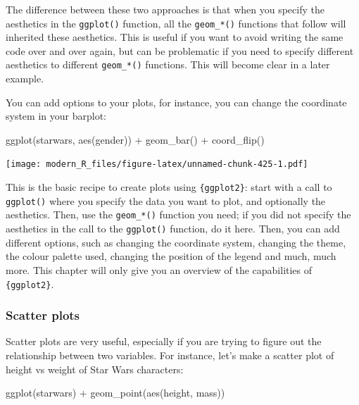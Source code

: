 \documentclass[
]{article}
\newenvironment{Shaded}{\begin{snugshade}}{\end{snugshade}}
\newcommand{\FunctionTok}[1]{\textcolor[rgb]{0.00,0.00,0.00}{#1}}
\newcommand{\NormalTok}[1]{#1}
\newcommand{\SpecialCharTok}[1]{\textcolor[rgb]{0.00,0.00,0.00}{#1}}
\begin{document}
The difference between these two approaches is that when you specify the aesthetics in the \texttt{ggplot()} function,
all the \texttt{geom\_*()} functions that follow will inherited these aesthetics. This is useful if you want to avoid
writing the same code over and over again, but can be problematic if you need to specify different aesthetics
to different \texttt{geom\_*()} functions. This will become clear in a later example.

You can add options to your plots, for instance, you can change the coordinate system in your barplot:

\begin{Shaded}
\begin{Highlighting}[]
\FunctionTok{ggplot}\NormalTok{(starwars, }\FunctionTok{aes}\NormalTok{(gender)) }\SpecialCharTok{+}
  \FunctionTok{geom\_bar}\NormalTok{() }\SpecialCharTok{+}
  \FunctionTok{coord\_flip}\NormalTok{()}
\end{Highlighting}
\end{Shaded}

\texttt{[image: modern\_R\_files/figure-latex/unnamed-chunk-425-1.pdf]}

This is the basic recipe to create plots using \texttt{\{ggplot2\}}: start with a call to \texttt{ggplot()} where you specify
the data you want to plot, and optionally the aesthetics. Then, use the \texttt{geom\_*()} function you need; if you
did not specify the aesthetics in the call to the \texttt{ggplot()} function, do it here. Then, you can add different
options, such as changing the coordinate system, changing the theme, the colour palette used, changing the
position of the legend and much, much more. This chapter will only give you an overview of the capabilities
of \texttt{\{ggplot2\}}.

\hypertarget{scatter-plots}{%
\subsubsection{Scatter plots}\label{scatter-plots}}

Scatter plots are very useful, especially if you are trying to figure out the relationship between two variables.
For instance, let's make a scatter plot of height vs weight of Star Wars characters:

\begin{Shaded}
\begin{Highlighting}[]
\FunctionTok{ggplot}\NormalTok{(starwars) }\SpecialCharTok{+}
  \FunctionTok{geom\_point}\NormalTok{(}\FunctionTok{aes}\NormalTok{(height, mass))}
\end{Highlighting}
\end{Shaded}
\end{document}
